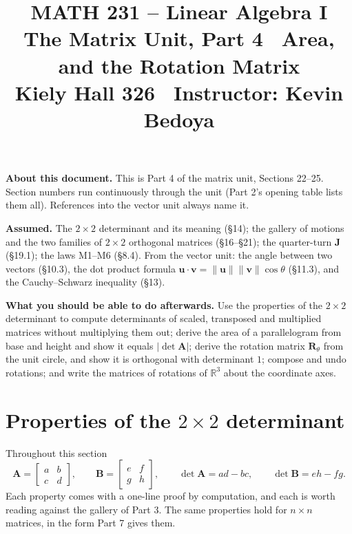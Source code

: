 \documentclass[11pt]{article}
\title{\vspace{-1.2cm}\textbf{\sffamily MATH 231 -- Linear Algebra I}\\[4pt]
       {\large\sffamily The Matrix Unit, Part 4 \textbullet\ Area, and the
        Rotation Matrix}\\[2pt]
       {\normalsize\sffamily Kiely Hall 326 \textbullet\
        Instructor: Kevin Bedoya}}
\author{}
\date{}
\theoremstyle{plain}
\theoremstyle{definition}
\theoremstyle{remark}
\newcommand{\R}{\mathbb{R}}
\newcommand{\vc}[1]{\mathbf{#1}}
\newcommand{\mt}[1]{\mathbf{#1}}
\newcommand{\norm}[1]{\lVert #1\rVert}
\begin{document}
\setcounter{section}{21}  %
\maketitle
\vspace{-1.6cm}

\noindent\textbf{About this document.} This is Part 4 of the matrix unit,
Sections 22--25. Section numbers run continuously through the unit (Part 2's
opening table lists them all). References into the vector unit always name it.

\medskip
\noindent\textbf{Assumed.} The $2\times2$ determinant and its meaning (\S14);
the gallery of motions and the two families of $2\times2$ orthogonal matrices
(\S16--\S21); the quarter-turn $\mt{J}$ (\S19.1); the laws M1--M6 (\S8.4). From
the vector unit: the angle between two vectors (\S10.3), the dot product formula
$\vc{u}\cdot\vc{v}=\norm{\vc{u}}\norm{\vc{v}}\cos\theta$ (\S11.3), and the
Cauchy--Schwarz inequality (\S13).

\medskip
\noindent\textbf{What you should be able to do afterwards.} Use the properties
of the $2\times2$ determinant to compute determinants of scaled, transposed and
multiplied matrices without multiplying them out; derive the area of a
parallelogram from base and height and show it equals $|\det\mt{A}|$; derive the
rotation matrix $\mt{R}_\theta$ from the unit circle, and show it is orthogonal
with determinant $1$; compose and undo rotations; and write the matrices of
rotations of $\R^{3}$ about the coordinate axes.

\section{Properties of the \texorpdfstring{$2\times2$}{2x2} determinant}
Throughout this section
\[
  \mt{A}=\begin{bmatrix}a&b\\c&d\end{bmatrix},\qquad
  \mt{B}=\begin{bmatrix}e&f\\g&h\end{bmatrix},\qquad
  \det\mt{A}=ad-bc,\qquad \det\mt{B}=eh-fg .
\]
Each property comes with a one-line proof by computation, and each is worth
reading against the gallery of Part 3. The same properties hold for
$n\times n$ matrices, in the form Part 7 gives them.
\end{document}
